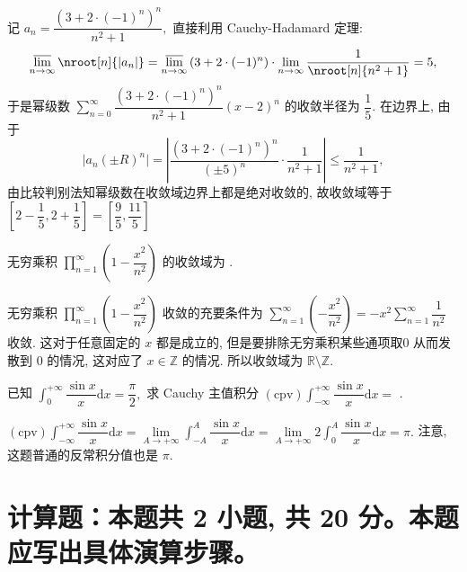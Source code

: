 \begin{solution}
记 $a_n = \dfrac{\left( 3 + 2 \cdot (-1)^n \right)^n}{n^2 + 1},$ 直接利用 Cauchy-Hadamard 定理:
\[\varlimsup_{n\to\infty} \nroot[n]{\lvert a_n \rvert} = \varlimsup_{n\to\infty} \left( 3 + 2 \cdot (-1)^n \right) \cdot \lim\limits_{n\to\infty} \dfrac{1}{\nroot[n]{n^2 + 1}} = 5,\]
于是幂级数 $\sum\limits_{n=0}^{\infty} \dfrac{\left( 3 + 2 \cdot (-1)^n \right)^n}{n^2 + 1} (x - 2)^n$ 的收敛半径为 $\dfrac{1}{5}.$ 在边界上, 由于
\[\lvert a_n (\pm R)^n \rvert = \left\lvert \dfrac{\left( 3 + 2 \cdot (-1)^n \right)^n}{(\pm 5)^n} \cdot \dfrac{1}{n^2 + 1} \right\rvert \leqslant \dfrac{1}{n^2 + 1},\]
由比较判别法知幂级数在收敛域边界上都是绝对收敛的, 故收敛域等于 $\left[2 - \dfrac{1}{5}, 2 + \dfrac{1}{5}\right] = \left[ \dfrac{9}{5}, \dfrac{11}{5} \right]$
\end{solution}

\begin{question}
无穷乘积 $\prod\limits_{n = 1}^\infty \left( 1 - \dfrac{x^2}{n^2} \right)$ 的收敛域为 .
\end{question}

\begin{solution}
无穷乘积 $\prod\limits_{n = 1}^\infty \left( 1 - \dfrac{x^2}{n^2} \right)$ 收敛的充要条件为 $\sum\limits_{n = 1}^\infty \left( - \dfrac{x^2}{n^2} \right) = -x^2 \sum\limits_{n = 1}^\infty \dfrac{1}{n^2}$ 收敛. 这对于任意固定的 $x$ 都是成立的, 但是要排除无穷乘积某些通项取$0$ 从而发散到 $0$ 的情况, 这对应了 $x \in \mathbb{Z}$ 的情况. 所以收敛域为 $\mathbb{R} \setminus \mathbb{Z}.$
\end{solution}

\begin{question}
已知 $\int_0^{+\infty} \dfrac{\sin x}{x} \mathrm{d} x = \dfrac{\pi}{2},$ 求 Cauchy 主值积分 $(\text{cpv}) \int_{-\infty}^{+\infty} \dfrac{\sin x}{x} \mathrm{d} x = $ \fillin[$\pi$].
\end{question}

\begin{solution}
$(\text{cpv}) \int_{-\infty}^{+\infty} \dfrac{\sin x}{x} \mathrm{d} x = \lim\limits_{A\to+\infty} \int_{-A}^{A} \dfrac{\sin x}{x} \mathrm{d} x = \lim\limits_{A\to+\infty} 2 \int_{0}^{A} \dfrac{\sin x}{x} \mathrm{d} x = \pi.$ 注意, 这题普通的反常积分值也是 $\pi.$
\end{solution}


\section{计算题：本题共 2 小题, 共 20 分。本题应写出具体演算步骤。}

